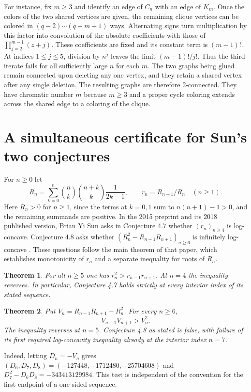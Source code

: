 \documentclass[11pt,a4paper]{article}
\newtheorem{theorem}{Theorem}[section]
\theoremstyle{definition}\newtheorem{problem}[theorem]{Problem}
\begin{document}
For instance, fix $m\ge3$ and identify an edge of $C_n$ with
an edge of $K_m$. Once the colors of the two shared vertices
are given, the remaining clique vertices can be colored in
$(q-2)\cdots(q-m+1)$ ways. Alternating signs turn multiplication
by this factor into convolution of the absolute coefficients with
those of $\prod_{j=2}^{m-1}(z+j)$. These coefficients are fixed
and its constant term is $(m-1)!$. At indices $1\le j\le5$,
division by $n^j$ leaves the limit $(m-1)!/j!$.
Thus the third iterate fails for all sufficiently large $n$ for
each $m$. The two graphs being glued remain connected upon deleting
any one vertex, and they retain a shared vertex after any single
deletion. The resulting graphs are therefore 2-connected. They have
chromatic number $m$ because $m\ge3$ and a proper cycle coloring
extends across the shared edge to a coloring of the clique.
\section{A simultaneous certificate for Sun's two conjectures}
\label{sec:sun}
For $n\ge0$ let
\[
 R_n=\sum_{k=0}^n\binom nk\binom{n+k}{k}\frac1{2k-1},
 \qquad r_n=R_{n+1}/R_n\quad(n\ge1).
\]
Here $R_n>0$ for $n\ge1$, since the terms at $k=0,1$ sum to
$n(n+1)-1>0$, and the remaining summands are positive.
In the 2015 preprint and its 2018 published version, Brian Yi Sun
asks in Conjecture 4.7 whether $(r_n)_{n\ge4}$ is log-concave.
Conjecture 4.8 asks whether $(R_n^2-R_{n-1}R_{n+1})_{n\ge6}$
is infinitely log-concave \cite{bysun}. These questions follow the main
theorem of that paper, which establishes monotonicity of $r_n$ and a
separate inequality for roots of $R_n$.
\begin{theorem}\label{thm:sun-ratio}
For all $n\ge5$ one has $r_n^2>r_{n-1}r_{n+1}$.
At $n=4$ the inequality reverses. In particular, Conjecture 4.7
holds strictly at every interior index of its stated sequence.
\end{theorem}
\begin{theorem}\label{thm:sun-minor}
Put $V_n=R_{n-1}R_{n+1}-R_n^2$. For every $n\ge6$,
\[
                V_{n-1}V_{n+1}>V_n^2 .
\]
The inequality reverses at $n=5$.
Conjecture 4.8 as stated is false, with failure of its first required
log-concavity inequality already at the interior index $n=7$.
\end{theorem}
Indeed, letting $D_n=-V_n$ gives
$(D_6,D_7,D_8)=(-127448,-1712480,-25704608)$ and
$D_7^2-D_6D_8=-343413129984$. This test is independent of the convention
for the first endpoint of a one-sided sequence.
\end{document}
